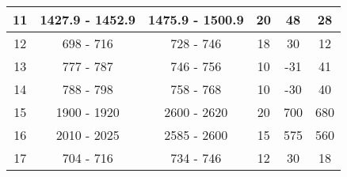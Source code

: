 \begin{table}[]
\begin{tabular}{|c|c|c|c|c|c|}
11                                                          & 1427.9 - 1452.9                                        & 1475.9 - 1500.9                                          & 20                                                                   & 48                                                               & 28                                                          \\ \hline
12                                                          & 698 - 716                                              & 728 - 746                                                & 18                                                                   & 30                                                               & 12                                                          \\ \hline
13                                                          & 777 - 787                                              & 746 - 756                                                & 10                                                                   & -31                                                              & 41                                                          \\ \hline
14                                                          & 788 - 798                                              & 758 - 768                                                & 10                                                                   & -30                                                              & 40                                                          \\ \hline
15                                                          & 1900 - 1920                                            & 2600 - 2620                                              & 20                                                                   & 700                                                              & 680                                                         \\ \hline
16                                                          & 2010 - 2025                                            & 2585 - 2600                                              & 15                                                                   & 575                                                              & 560                                                         \\ \hline
17                                                          & 704 - 716                                              & 734 - 746                                                & 12                                                                   & 30                                                               & 18                                                          \\ \hline

\end{tabular}
\end{table}
